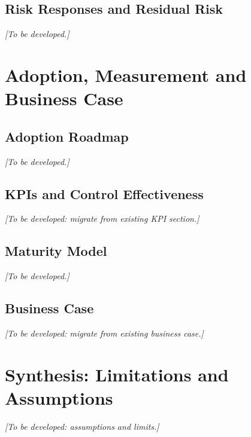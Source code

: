 \documentclass[12pt,a4paper]{article}
\begin{document}
\subsection{Risk Responses and Residual Risk}
\textit{[To be developed.]}

\section{Adoption, Measurement and Business Case}

\subsection{Adoption Roadmap}
\textit{[To be developed.]}

\subsection{KPIs and Control Effectiveness}
\textit{[To be developed: migrate from existing KPI section.]}

\subsection{Maturity Model}
\textit{[To be developed.]}

\subsection{Business Case}
\textit{[To be developed: migrate from existing business case.]}

\section{Synthesis: Limitations and Assumptions}
\textit{[To be developed: assumptions and limits.]}
\end{document}
